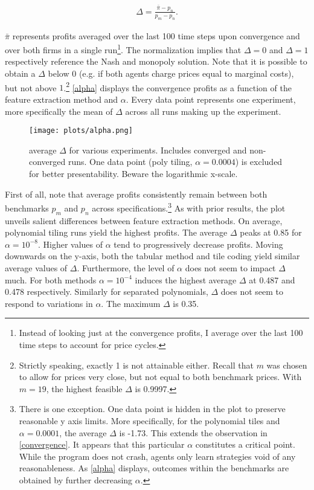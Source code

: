 \begin{gather}
\Delta = \frac{\bar{\pi} - p_n}{p_m - p_n}.
\end{gather}

$\bar{\pi}$ represents profits averaged over the last 100 time steps upon convergence and over both firms in a single run\footnote{Instead of looking just at the convergence profits, I average over the last 100 time steps to account for price cycles.}. The normalization implies that $\Delta = 0$ and $\Delta = 1$ respectively reference the Nash and monopoly solution. Note that it is possible to obtain a $\Delta$ below $0$ (e.g. if both agents charge prices equal to marginal costs), but not above $1$.\footnote{Strictly speaking, exactly 1 is not attainable either. Recall that $m$ was chosen to allow for prices very close, but not equal to both benchmark prices. With $m = 19$, the highest feasible $\Delta$ is 0.9997.} \autoref{alpha} displays the convergence profits as a function of the feature extraction method and $\alpha$. Every data point represents one experiment, more specifically the mean of $\Delta$ across all runs making up the experiment.

\begin{figure}
	\texttt{[image: plots/alpha.png]}
	\caption{average $\Delta$ for various experiments. Includes converged and non-converged runs. One data point (poly tiling, $\alpha = 0.0004$) is excluded for better presentability. Beware the logarithmic x-scale.}
	\label{alpha}
\end{figure}

First of all, note that average profits consistently remain between both benchmarks $p_m$ and $p_n$ across specifications.\footnote{There is one exception. One data point is hidden in the plot to preserve reasonable y axis limits. More specifically, for the polynomial tiles and $\alpha = 0.0001$, the average $\Delta$ is -1.73. This extends the observation in \autoref{convergence}. It appears that this particular $\alpha$ constitutes a critical point. While the program does not crash, agents only learn strategies void of any reasonableness. As \autoref{alpha} displays, outcomes within the benchmarks are obtained by further decreasing $\alpha$.} As with prior results, the plot unveils salient differences between feature extraction methods.  On average, polynomial tiling runs yield the highest profits. The average $\Delta$ peaks at 0.85 for $\alpha = 10^{-8}$. Higher values of $\alpha$ tend to progressively decrease profits. Moving downwards on the y-axis, both the tabular method and tile coding yield similar average values of $\Delta$. Furthermore, the level of $\alpha$ does not seem to impact $\Delta$ much. For both methods $\alpha = 10^{-4}$ induces the highest average $\Delta$ at 0.487 and 0.478 respectively. Similarly for separated polynomials, $\Delta$ does not seem to respond to variations in $\alpha$. The maximum $\Delta$ is 0.35.

